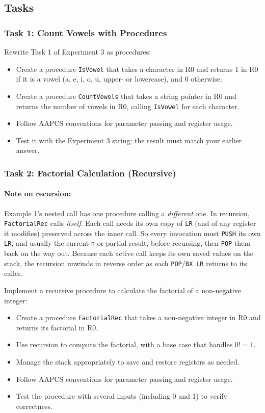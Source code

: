 \newpage
\subsection{Tasks}

\subsubsection{Task 1: Count Vowels with Procedures}
Rewrite Task 1 of Experiment 3 as procedures:
\begin{itemize}[nosep]
    \item Create a procedure \texttt{IsVowel} that takes a character in R0 and returns 1 in R0 if it is a vowel (a, e, i, o, u, upper- or lowercase), and 0 otherwise.
    \item Create a procedure \texttt{CountVowels} that takes a string pointer in R0 and returns the number of vowels in R0, calling \texttt{IsVowel} for each character.
    \item Follow AAPCS conventions for parameter passing and register usage.
    \item Test it with the Experiment 3 string; the result must match your earlier answer.
\end{itemize}

\subsubsection{Task 2: Factorial Calculation (Recursive)}
\paragraph{Note on recursion:} Example 1's nested call has one procedure calling a \emph{different} one. In recursion, \texttt{FactorialRec} calls \emph{itself}. Each call needs its own copy of \texttt{LR} (and of any register it modifies) preserved across the inner call. So every invocation must \texttt{PUSH} its own \texttt{LR}, and usually the current \texttt{n} or partial result, before recursing, then \texttt{POP} them back on the way out. Because each active call keeps its own saved values on the stack, the recursion unwinds in reverse order as each \texttt{POP}/\texttt{BX LR} returns to its caller.

Implement a recursive procedure to calculate the factorial of a non-negative integer:
\begin{itemize}[nosep]
    \item Create a procedure \texttt{FactorialRec} that takes a non-negative integer in R0 and returns its factorial in R0.
    \item Use recursion to compute the factorial, with a base case that handles $0! = 1$.
    \item Manage the stack appropriately to save and restore registers as needed.
    \item Follow AAPCS conventions for parameter passing and register usage.
    \item Test the procedure with several inputs (including 0 and 1) to verify correctness.
\end{itemize}
